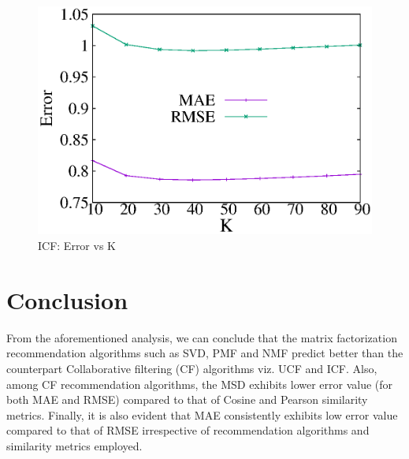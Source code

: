 \documentclass[journal,onecolumn]{IEEEtran}
\begin{document}
\begin{figure}[H]
\begin{center}
 \includegraphics[scale = 0.98] {images/icfBestK.eps}
 \caption {ICF: Error vs  K} \label{icf_3}
 \end{center}
\end{figure}

\section{Conclusion}
From the aforementioned analysis, we can conclude that the matrix factorization recommendation algorithms such as SVD, PMF and NMF predict better than the counterpart Collaborative filtering (CF) algorithms viz. UCF and ICF.  Also, among CF recommendation algorithms, the MSD exhibits lower error value (for both MAE and RMSE) compared to that of Cosine and Pearson similarity metrics. Finally, it is also evident that MAE consistently exhibits low error value compared to that of RMSE irrespective of recommendation algorithms and similarity metrics employed.
\end{document}
